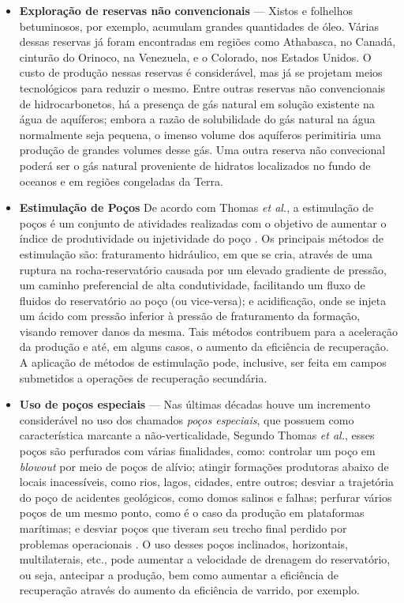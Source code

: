 \begin{itemize}
\item \textbf{Exploração de reservas não convencionais} --- Xistos e folhelhos betuminosos, por exemplo, acumulam grandes quantidades de óleo. Várias dessas reservas já foram encontradas em regiões como Athabasca, no Canadá, cinturão do Orinoco, na Venezuela, e o Colorado, nos Estados Unidos. O custo de produção nessas reservas é considerável, mas já se projetam meios tecnológicos para reduzir o mesmo. Entre outras reservas não convencionais de hidrocarbonetos, há a presença de gás natural em solução existente na água de aquíferos; embora a razão de solubilidade do gás natural na água normalmente seja pequena, o imenso volume dos aquíferos perimitiria uma produção de grandes volumes desse gás. Uma outra reserva não convecional poderá ser o gás natural proveniente de hidratos localizados no fundo de oceanos e em regiões congeladas da Terra.
\item \textbf{Estimulação de Poços} De acordo com Thomas \textit{et al.}, a estimulação de poços é um conjunto de atividades realizadas com o objetivo de aumentar o índice de produtividade ou injetividade do poço \cite[p.~166]{engpetro}. Os principais métodos de estimulação são: fraturamento hidráulico, em que se cria, através de uma ruptura na rocha-reservatório causada por um elevado gradiente de pressão, um caminho preferencial de alta condutividade, facilitando um fluxo de fluidos do reservatório ao poço (ou vice-versa); e acidificação, onde se injeta um ácido com pressão inferior à pressão de fraturamento da formação, visando remover danos da mesma. Tais métodos contribuem para a aceleração da produção e até, em alguns casos, o aumento da eficiência de recuperação. A aplicação de métodos de estimulação pode, inclusive, ser feita em campos submetidos a operações de recuperação secundária.
\item \textbf{Uso de poços especiais} --- Nas últimas décadas houve um incremento considerável no uso dos chamados \textit{poços especiais}, que possuem como característica marcante a não-verticalidade, Segundo Thomas \textit{et al.}, esses poços são perfurados com várias finalidades, como: controlar um poço em \textit{blowout} por meio de poços de alívio; atingir formações produtoras abaixo de locais inacessíveis, como rios, lagos, cidades, entre outros; desviar a trajetória do poço de acidentes geológicos, como domos salinos e falhas; perfurar vários poços de um mesmo ponto, como é o caso da produção em plataformas marítimas; e desviar poços que tiveram seu trecho final perdido por problemas operacionais \cite[p.~106]{engpetro}. O uso desses poços inclinados, horizontais, multilaterais, etc., pode aumentar a velocidade de drenagem do reservatório, ou seja, antecipar a produção, bem como aumentar a eficiência de recuperação através do aumento da eficiência de varrido, por exemplo.

\end{itemize}
